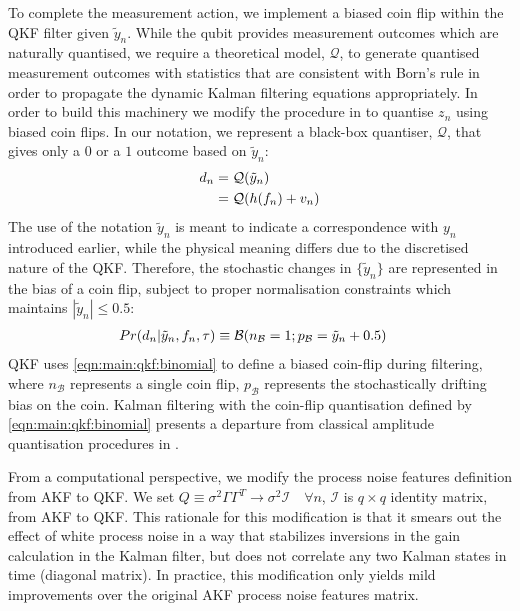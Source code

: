 To complete the measurement action, we implement a biased coin flip within the QKF filter given $\tilde{y}_n$.  While the qubit provides measurement outcomes which are naturally quantised, we require a theoretical model, $\mathcal{Q}$, to generate quantised measurement outcomes with statistics that are consistent with Born's rule in order to propagate the dynamic Kalman filtering equations appropriately. In order to build this machinery we modify the procedure in \cite{karlsson2005} to quantise $z_n$ using biased coin flips. In our notation, we represent a black-box quantiser, $\mathcal{Q}$, that gives only a $0$ or a $1$ outcome based on $\tilde{y}_n$:
\begin{align}
	d_n &= \mathcal{Q}(\tilde{y}_n)\\
	&=  \mathcal{Q}(h(f_n) + v_n)
\end{align}
The use of the notation $\tilde{y}_n$ is meant to indicate a correspondence with $y_{n}$ introduced earlier, while the physical meaning differs due to the discretised nature of the QKF.  Therefore, the stochastic changes in $\{ \tilde{y}_n\}$ are represented in the bias of a coin flip, subject to proper normalisation constraints which maintains $|\tilde{y}_n| \leq 0.5$:
\begin{align}
	Pr(d_n| \tilde{y}_n, f_{n}, \tau) & \equiv \mathcal{B}(n_{\mathcal{B}}=1;p_{\mathcal{B}}= \tilde{y}_n + 0.5 ) \label{eqn:main:qkf:binomial}
\end{align}
QKF uses \cref{eqn:main:qkf:binomial} to define a biased coin-flip during filtering, where $n_{\mathcal{B}}$ represents a single coin flip, $p_{\mathcal{B}}$ represents the stochastically drifting bias on the coin. Kalman filtering with the coin-flip quantisation defined by \cref{eqn:main:qkf:binomial} presents a departure from classical amplitude quantisation procedures in \cite{widrow1996, karlsson2005}.

From a computational perspective, we modify the process noise features definition from AKF to QKF. We set $Q \equiv \sigma^2\Gamma \Gamma^T \to \sigma^2 \mathcal{I} \quad \forall n $, $\mathcal{I}$ is $q\times q$ identity matrix, from AKF to QKF. This rationale for this modification is that it smears out the effect of white process noise in a way that stabilizes inversions in the gain calculation in the Kalman filter, but does not correlate any two Kalman states in time (diagonal matrix). In practice, this modification only yields mild improvements over the original AKF process noise features matrix.

